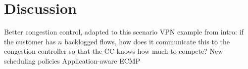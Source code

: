 \section{Discussion}\label{s:discussion}

\begin{outline}
\1 Better congestion control, adapted to this scenario
    \2 VPN example from intro: if the customer has $n$ backlogged flows, how does it communicate this to the congestion controller so that the CC knows how much to compete?
\1 New scheduling policies
    \2 Application-aware
\1 ECMP
\end{outline}
